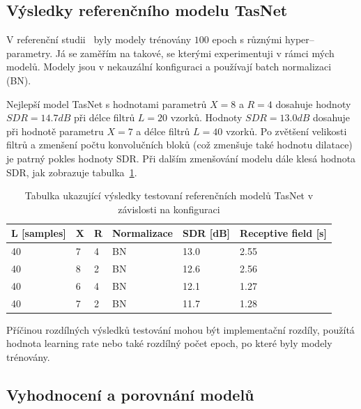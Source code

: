 \subsection{Výsledky referenčního modelu TasNet}

V referenční studii~\cite{luo2018convtasnet} byly modely trénovány $100$ epoch s různými hyper--parametry. Já se zaměřím na takové, se kterými experimentuji v rámci mých modelů. Modely jsou v nekauzální konfiguraci a používají batch normalizaci (BN).

Nejlepší model TasNet s hodnotami parametrů $X=8$ a $R=4$ dosahuje hodnoty $SDR = 14.7 dB$ při délce filtrů $L = 20$ vzorků. Hodnoty $SDR = 13.0 dB$ dosahuje při hodnotě parametru $X = 7$ a délce filtrů $L = 40$ vzorků. Po zvětšení velikosti filtrů a zmenšení počtu konvolučních bloků (což zmenšuje také hodnotu dilatace) je patrný pokles hodnoty SDR. Při dalším zmenšování modelu dále klesá hodnota SDR, jak zobrazuje tabulka~\ref{tab:tasnet}.

\begin{table}[hbt]
\centering
\caption{Tabulka ukazující výsledky testovaní referenčních modelů TasNet v závislosti na konfiguraci}
\label{tab:tasnet}
\begin{tabular}{|l|l|l|l|l|l|}
\hline
\textbf{L {[}samples{]}} & \textbf{X} & \textbf{R} & \textbf{Normalizace} & \textbf{SDR {[}dB{]}} & \textbf{Receptive field {[}s{]}} \\ \hline
40 & 7 & 4 & BN & 13.0 & 2.55 \\ \hline
40 & 8 & 2 & BN & 12.6 & 2.56 \\ \hline
40 & 6 & 4 & BN & 12.1 & 1.27 \\ \hline
40 & 7 & 2 & BN & 11.7 & 1.28 \\ \hline
\end{tabular}
\end{table}


Příčinou rozdílných výsledků testování mohou být implementační rozdíly, použítá hodnota learning rate nebo také rozdílný počet epoch, po které byly modely trénovány.



\subsection{Vyhodnocení a porovnání modelů}


